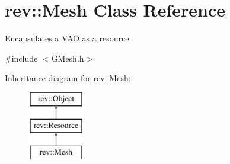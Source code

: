 \hypertarget{classrev_1_1_mesh}{}\section{rev\+::Mesh Class Reference}
\label{classrev_1_1_mesh}


Encapsulates a V\+AO as a resource.  




{\ttfamily \#include $<$G\+Mesh.\+h$>$}

Inheritance diagram for rev\+::Mesh\+:\begin{figure}[H]
\begin{center}
\leavevmode
\includegraphics[height=3.000000cm]{classrev_1_1_mesh}
\end{center}
\end{figure}

